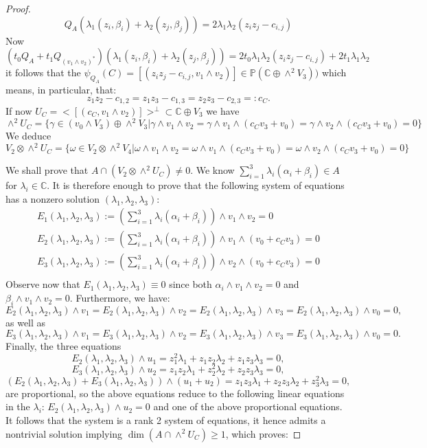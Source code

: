 \documentclass[a4paper,11pt]{amsart}
\theoremstyle{definition}
\numberwithin{equation}{section}
\numberwithin{equation}{section} \theoremstyle{definition}
\begin{document}
\begin{proof}
$$Q_A(\lambda_1 (z_i,\beta_i)+\lambda_2 (z_j,\beta_j))= 2\lambda_1\lambda_2 (z_iz_j-c_{i,j})$$
Now 
$$(t_0 Q_A+t_1 Q_{(v_1\wedge v_2)^*}) (\lambda_1 (z_i,\beta_i)+\lambda_2 (z_j,\beta_j))=2t_0 \lambda_1\lambda_2 (z_iz_j-c_{i,j})+ 2t_1\lambda_1\lambda_2$$
it follows that the $\psi_{Q_A}(C)=[(z_iz_j-c_{i,j},  v_1\wedge v_2) ]\in {{\mathbb{P}}}({{\mathbb{C}  }}\oplus \wedge^2 V_3))$ which means, in particular, that:
$$z_1z_2-c_{1,2}=z_1z_3-c_{1,3}=z_2z_3-c_{2,3}=:c_{C}.$$
If now $U_C=<[(c_C,  v_1\wedge v_2) ]>^\perp\subset {{\mathbb{C}  }}\oplus V_3$ we have 
$$\wedge^2 U_C=\{\gamma\in (v_0\wedge V_3)\oplus \wedge^2 V_3 |  \gamma \wedge v_1\wedge v_2 =\gamma \wedge v_1\wedge (c_C v_3+v_0)=\gamma \wedge v_2\wedge (c_C v_3+v_0)=0 \}$$
 We deduce 
 $$V_2\otimes \wedge^2 U_C= \{\omega\in V_2 \otimes \wedge^2 V_4 |  \omega \wedge v_1\wedge v_2 =\omega \wedge v_1\wedge (c_C v_3+v_0)=\omega \wedge v_2\wedge (c_C v_3+v_0)=0 \}$$
 
We shall prove that $A\cap (V_2\otimes \wedge^2 U_C)\neq 0$. We know $\sum_{i=1}^3 \lambda_i (\alpha_i+\beta_i)\in A$ for $\lambda_i\in {{\mathbb{C}  }}$. It is therefore enough to prove that the following system of equations has a nonzero solution $(\lambda_1,\lambda_2,\lambda_3)$:
\begin{equation*}
\begin{split}
E_1(\lambda_1,\lambda_2,\lambda_3):=(\sum_{i=1}^3 \lambda_i (\alpha_i+\beta_i))\wedge v_1\wedge v_2=0\\
E_2(\lambda_1,\lambda_2,\lambda_3):=(\sum_{i=1}^3 \lambda_i (\alpha_i+\beta_i))\wedge v_1\wedge (v_0+c_{C} v_3)=0\\
E_3(\lambda_1,\lambda_2,\lambda_3):=(\sum_{i=1}^3 \lambda_i (\alpha_i+\beta_i))\wedge v_2\wedge (v_0+c_{C} v_3)=0\\
\end{split}
\end{equation*}
Observe now that $E_1(\lambda_1,\lambda_2,\lambda_3)\equiv 0$  since both $\alpha_i\wedge v_1\wedge v_2=0$ and $\beta_i\wedge v_1\wedge v_2=0$.
Furthermore, we have:
$$E_2(\lambda_1,\lambda_2,\lambda_3)\wedge v_1=E_2(\lambda_1,\lambda_2,\lambda_3)\wedge v_2=E_2(\lambda_1,\lambda_2,\lambda_3)\wedge v_3=E_2(\lambda_1,\lambda_2,\lambda_3)\wedge v_0=0,$$
as well as 
$$E_3(\lambda_1,\lambda_2,\lambda_3)\wedge v_1=E_3(\lambda_1,\lambda_2,\lambda_3)\wedge v_2=E_3(\lambda_1,\lambda_2,\lambda_3)\wedge v_3=E_3(\lambda_1,\lambda_2,\lambda_3)\wedge v_0=0.$$
Finally, the three equations
$$E_2(\lambda_1,\lambda_2,\lambda_3)\wedge u_1= z_1^2 \lambda_1 +z_1z_2 \lambda_2+z_1z_3 \lambda_3=0,$$
$$E_3(\lambda_1,\lambda_2,\lambda_3)\wedge u_2= z_1z_2 \lambda_1 +z_2^2 \lambda_2+z_2z_3 \lambda_3=0,$$
$$(E_2(\lambda_1,\lambda_2,\lambda_3)+E_3(\lambda_1,\lambda_2,\lambda_3))\wedge (u_1+u_2)= z_1z_3 \lambda_1 +z_2 z_3 \lambda_2+z_3^2 \lambda_3=0,$$
are proportional, so the above equations reduce to the following linear equations in the $\lambda_i$:
$E_2(\lambda_1,\lambda_2,\lambda_3)\wedge u_2=0$
and one of the above proportional equations.
It follows that the system is a rank 2 system of equations, it hence admits a nontrivial solution implying 
$\dim (A\cap \wedge^2 U_C)\geq 1$, which proves:


\end{proof}
\end{document}
